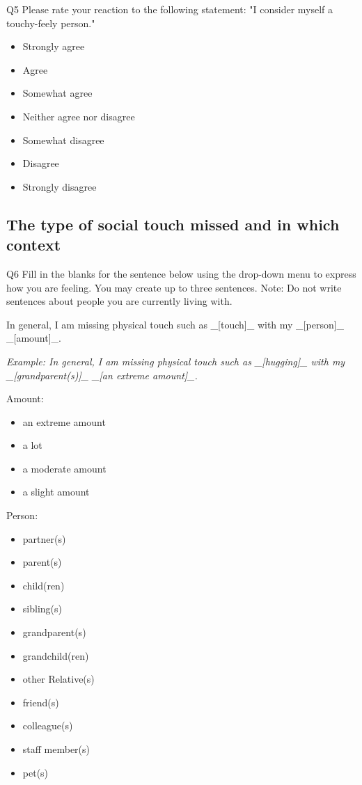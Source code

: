 \documentclass[acmsmall]{acmart}
\begin{document}
Q5 
Please rate your reaction to the following statement: "I consider myself a touchy-feely person."
\begin{itemize}
\item Strongly agree  
\item Agree   
\item Somewhat agree   
\item Neither agree nor disagree  
\item Somewhat disagree   
\item Disagree  
\item Strongly disagree   
\end{itemize}

\subsection{The type of social touch missed and in which context}

Q6 Fill in the blanks for the sentence below using the drop-down menu to express how you are feeling.   
You may create up to three sentences.  
Note: Do not write sentences about people you are currently living with.  
   
In general, I am missing physical touch such as \_[touch]\_ with my \_[person]\_  \_[amount]\_.   
   
\emph{Example: In general, I am missing physical touch such as \_[hugging]\_ with my \_[grandparent(s)]\_  \_[an extreme amount]\_.}   

Amount: 
\begin{itemize}
\item an extreme amount
\item a lot
\item a moderate amount
\item a slight amount  
\end{itemize}

Person:
\begin{itemize}
\item partner(s) 
\item parent(s) 
\item child(ren)  
\item sibling(s)  
\item grandparent(s) 
\item grandchild(ren)  
\item other Relative(s)  
\item friend(s)  
\item colleague(s)  
\item staff member(s)  
\item pet(s)  
\end{itemize}
\end{document}
